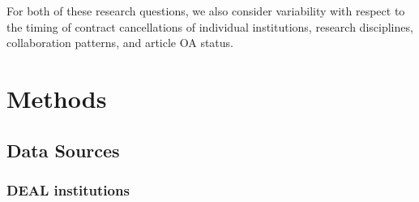 \documentclass[
]{article}
\begin{document}
For both of these research questions, we also consider variability with respect to the timing of contract cancellations of individual institutions, research disciplines, collaboration patterns, and article OA status.

\hypertarget{methods}{%
\section{Methods}\label{methods}}

\hypertarget{data-sources}{%
\subsection{Data Sources}\label{data-sources}}

\hypertarget{deal-institutions}{%
\subsubsection{DEAL institutions}\label{deal-institutions}}
\end{document}
